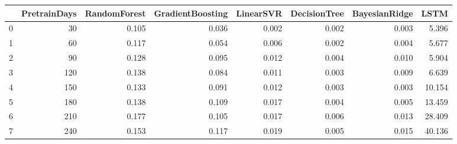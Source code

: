 \begin{tabular}{lrrrrrrr}
\toprule
{} &  PretrainDays &  RandomForest &  GradientBoosting &  LinearSVR &  DecisionTree &  BayesianRidge &   LSTM \\
\midrule
0 &            30 &         0.105 &             0.036 &      0.002 &         0.002 &          0.003 &  5.396 \\
1 &            60 &         0.117 &             0.054 &      0.006 &         0.002 &          0.004 &  5.677 \\
2 &            90 &         0.128 &             0.095 &      0.012 &         0.004 &          0.010 &  5.904 \\
3 &           120 &         0.138 &             0.084 &      0.011 &         0.003 &          0.009 &  6.639 \\
4 &           150 &         0.133 &             0.091 &      0.012 &         0.003 &          0.003 & 10.154 \\
5 &           180 &         0.138 &             0.109 &      0.017 &         0.004 &          0.005 & 13.459 \\
6 &           210 &         0.177 &             0.105 &      0.017 &         0.006 &          0.013 & 28.409 \\
7 &           240 &         0.153 &             0.117 &      0.019 &         0.005 &          0.015 & 40.136 \\
\bottomrule
\end{tabular}
